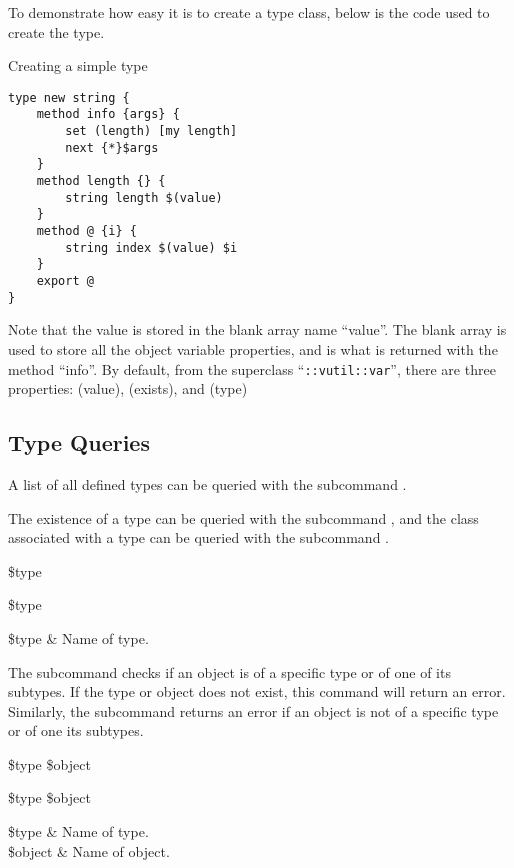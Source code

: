 \documentclass{article}
\begin{document}
To demonstrate how easy it is to create a type class, below is the code used to create the  type.
\begin{example}{Creating a simple type}
\begin{lstlisting}
type new string {
    method info {args} {
        set (length) [my length]
        next {*}$args
    }
    method length {} {
        string length $(value)
    }
    method @ {i} {
        string index $(value) $i
    }
    export @
}
\end{lstlisting}
\end{example}

Note that the value is stored in the blank array name ``value''. 
The blank array is used to store all the object variable properties, and is what is returned with the method ``info''.
By default, from the superclass ``\texttt{::vutil::var}'', there are three properties: (value), (exists), and (type)

\clearpage
\subsection{Type Queries}
A list of all defined types can be queried with the subcommand . 
\begin{syntax}
\end{syntax}

The existence of a type can be queried with the subcommand , and 
the class associated with a type can be queried with the subcommand . 
\begin{syntax}
 \$type
\end{syntax}
\begin{syntax}
 \$type
\end{syntax}
\begin{args}
\$type & Name of type. 
\end{args}

The subcommand  checks if an object is of a specific type or of one of its subtypes.
If the type or object does not exist, this command will return an error.
Similarly, the subcommand  returns an error if an object is not of a specific type or of one its subtypes.

\begin{syntax}
 \$type \$object
\end{syntax}
\begin{syntax}
 \$type \$object
\end{syntax}
\begin{args}
\$type & Name of type. \\
\$object & Name of object.
\end{args}
\end{document}
